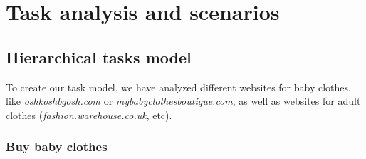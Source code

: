 \section{Task analysis and scenarios}

\subsection{Hierarchical tasks model}

To create our task model, we have analyzed different websites for baby clothes, like \textit{oshkoshbgosh.com} or \textit{mybabyclothesboutique.com}, as well as websites for adult clothes (\textit{fashion.warehouse.co.uk}, etc).

\subsubsection{Buy baby clothes}
